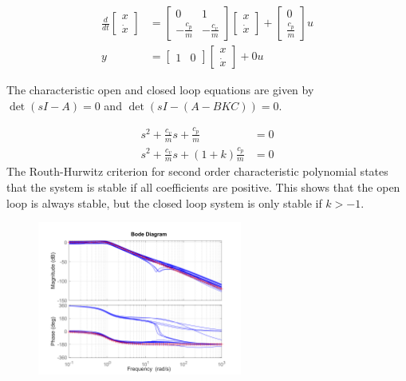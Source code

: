 \documentclass{article}
\begin{document}
\begin{align}
    \frac{d}{dt} \begin{bmatrix}
        x \\
        \dot{x}
    \end{bmatrix} &= \begin{bmatrix}
        0 & 1 \\
        -\frac{c_p}{m} & -\frac{c_v}{m}
    \end{bmatrix} \begin{bmatrix}
        x \\
        \dot{x}
    \end{bmatrix} + \begin{bmatrix}
        0 \\
        \frac{c_p}{m}
    \end{bmatrix} u \\
    y &= \begin{bmatrix}
        1 & 0
    \end{bmatrix} \begin{bmatrix}
        x \\
        \dot{x}
    \end{bmatrix} + 0u
\end{align}

The characteristic open and closed loop equations are given by $\det(sI - A) = 0$ and $\det(sI - (A-BKC)) = 0$.

\begin{align}
    s^2 + \frac{c_v}{m}s + \frac{c_p}{m} &= 0 \\
    s^2 + \frac{c_v}{m}s + (1+k)\frac{c_p}{m} &= 0
\end{align}
The Routh-Hurwitz criterion for second order characteristic polynomial states that the system is stable if all coefficients are positive.
This shows that the open loop is always stable, but the closed loop system is only stable if $k > -1$.

\begin{figure}[H] %
    \centering
    \includegraphics[width=0.6\textwidth]{figures/bode_G.png}
    \caption{}
    \label{fig:bode_G}
\end{figure}
\end{document}
